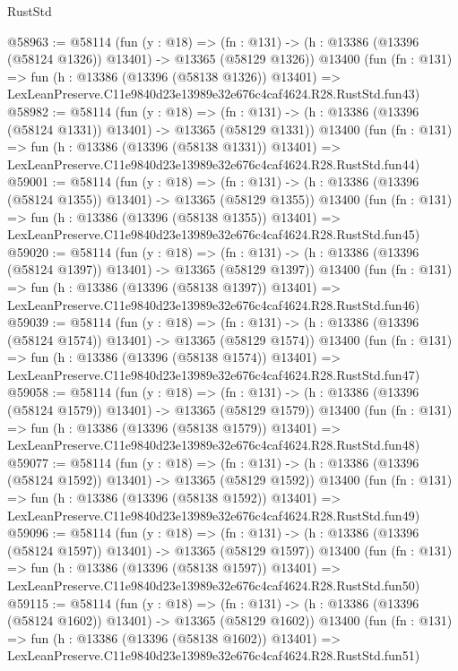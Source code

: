 \begin{lexlean}{RustStd}
\begin{coremodule}
@58963 := @58114
    (fun (y : @18) =>
    (fn : @131) -> (h : @13386 (@13396 (@58124 @1326)) @13401) -> @13365 (@58129 @1326))
    @13400
    (fun (fn : @131) =>
    fun (h : @13386 (@13396 (@58138 @1326)) @13401) =>
    LexLeanPreserve.C11e9840d23e13989e32e676c4caf4624.R28.RustStd.fun43)
@58982 := @58114
    (fun (y : @18) =>
    (fn : @131) -> (h : @13386 (@13396 (@58124 @1331)) @13401) -> @13365 (@58129 @1331))
    @13400
    (fun (fn : @131) =>
    fun (h : @13386 (@13396 (@58138 @1331)) @13401) =>
    LexLeanPreserve.C11e9840d23e13989e32e676c4caf4624.R28.RustStd.fun44)
@59001 := @58114
    (fun (y : @18) =>
    (fn : @131) -> (h : @13386 (@13396 (@58124 @1355)) @13401) -> @13365 (@58129 @1355))
    @13400
    (fun (fn : @131) =>
    fun (h : @13386 (@13396 (@58138 @1355)) @13401) =>
    LexLeanPreserve.C11e9840d23e13989e32e676c4caf4624.R28.RustStd.fun45)
@59020 := @58114
    (fun (y : @18) =>
    (fn : @131) -> (h : @13386 (@13396 (@58124 @1397)) @13401) -> @13365 (@58129 @1397))
    @13400
    (fun (fn : @131) =>
    fun (h : @13386 (@13396 (@58138 @1397)) @13401) =>
    LexLeanPreserve.C11e9840d23e13989e32e676c4caf4624.R28.RustStd.fun46)
@59039 := @58114
    (fun (y : @18) =>
    (fn : @131) -> (h : @13386 (@13396 (@58124 @1574)) @13401) -> @13365 (@58129 @1574))
    @13400
    (fun (fn : @131) =>
    fun (h : @13386 (@13396 (@58138 @1574)) @13401) =>
    LexLeanPreserve.C11e9840d23e13989e32e676c4caf4624.R28.RustStd.fun47)
@59058 := @58114
    (fun (y : @18) =>
    (fn : @131) -> (h : @13386 (@13396 (@58124 @1579)) @13401) -> @13365 (@58129 @1579))
    @13400
    (fun (fn : @131) =>
    fun (h : @13386 (@13396 (@58138 @1579)) @13401) =>
    LexLeanPreserve.C11e9840d23e13989e32e676c4caf4624.R28.RustStd.fun48)
@59077 := @58114
    (fun (y : @18) =>
    (fn : @131) -> (h : @13386 (@13396 (@58124 @1592)) @13401) -> @13365 (@58129 @1592))
    @13400
    (fun (fn : @131) =>
    fun (h : @13386 (@13396 (@58138 @1592)) @13401) =>
    LexLeanPreserve.C11e9840d23e13989e32e676c4caf4624.R28.RustStd.fun49)
@59096 := @58114
    (fun (y : @18) =>
    (fn : @131) -> (h : @13386 (@13396 (@58124 @1597)) @13401) -> @13365 (@58129 @1597))
    @13400
    (fun (fn : @131) =>
    fun (h : @13386 (@13396 (@58138 @1597)) @13401) =>
    LexLeanPreserve.C11e9840d23e13989e32e676c4caf4624.R28.RustStd.fun50)
@59115 := @58114
    (fun (y : @18) =>
    (fn : @131) -> (h : @13386 (@13396 (@58124 @1602)) @13401) -> @13365 (@58129 @1602))
    @13400
    (fun (fn : @131) =>
    fun (h : @13386 (@13396 (@58138 @1602)) @13401) =>
    LexLeanPreserve.C11e9840d23e13989e32e676c4caf4624.R28.RustStd.fun51)

\end{coremodule}
\end{lexlean}
